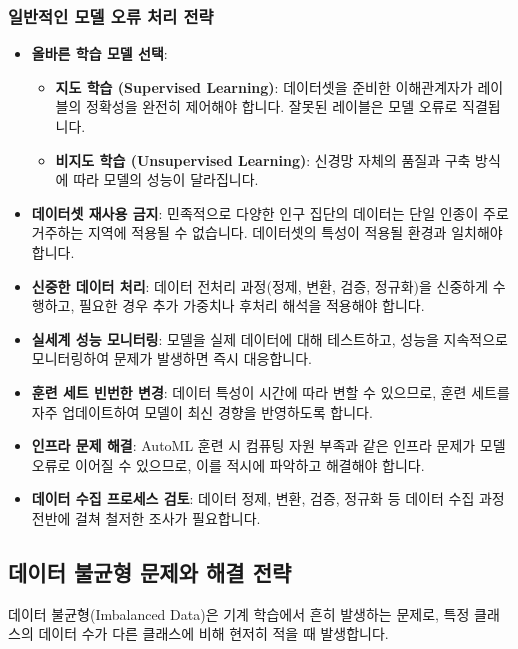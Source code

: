 \documentclass[11pt,a4paper]{article}
\theoremstyle{definition}
\begin{document}
\begin{itemize}
\begin{itemize}
    \subsubsection*{일반적인 모델 오류 처리 전략}

    \begin{itemize}
        \item \textbf{올바른 학습 모델 선택}:
        \begin{itemize}
            \item \textbf{지도 학습 (Supervised Learning)}: 데이터셋을 준비한 이해관계자가 레이블의 정확성을 완전히 제어해야 합니다. 잘못된 레이블은 모델 오류로 직결됩니다.
            \item \textbf{비지도 학습 (Unsupervised Learning)}: 신경망 자체의 품질과 구축 방식에 따라 모델의 성능이 달라집니다.
        \end{itemize}
        \item \textbf{데이터셋 재사용 금지}: 민족적으로 다양한 인구 집단의 데이터는 단일 인종이 주로 거주하는 지역에 적용될 수 없습니다. 데이터셋의 특성이 적용될 환경과 일치해야 합니다.
        \item \textbf{신중한 데이터 처리}: 데이터 전처리 과정(정제, 변환, 검증, 정규화)을 신중하게 수행하고, 필요한 경우 추가 가중치나 후처리 해석을 적용해야 합니다.
        \item \textbf{실세계 성능 모니터링}: 모델을 실제 데이터에 대해 테스트하고, 성능을 지속적으로 모니터링하여 문제가 발생하면 즉시 대응합니다.
        \item \textbf{훈련 세트 빈번한 변경}: 데이터 특성이 시간에 따라 변할 수 있으므로, 훈련 세트를 자주 업데이트하여 모델이 최신 경향을 반영하도록 합니다.
        \item \textbf{인프라 문제 해결}: AutoML 훈련 시 컴퓨팅 자원 부족과 같은 인프라 문제가 모델 오류로 이어질 수 있으므로, 이를 적시에 파악하고 해결해야 합니다.
        \item \textbf{데이터 수집 프로세스 검토}: 데이터 정제, 변환, 검증, 정규화 등 데이터 수집 과정 전반에 걸쳐 철저한 조사가 필요합니다.
    \end{itemize}

\newpage
\subsection*{데이터 불균형 문제와 해결 전략}

데이터 불균형(Imbalanced Data)은 기계 학습에서 흔히 발생하는 문제로, 특정 클래스의 데이터 수가 다른 클래스에 비해 현저히 적을 때 발생합니다.


\end{itemize}
\end{itemize}
\end{document}
